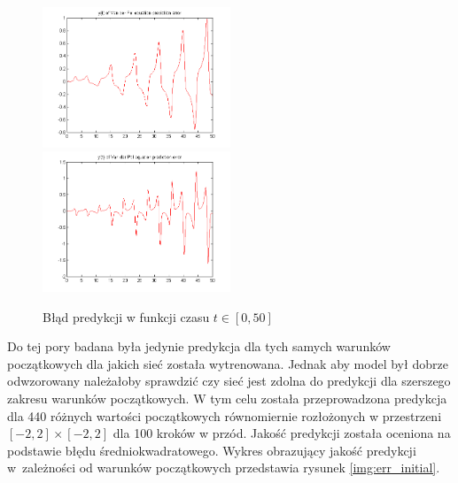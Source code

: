 \begin{figure}[ht!]
	\centering

	\subfloat
	{\includegraphics[width=0.5\textwidth]
	{images/err1000_x1.png}}
	\subfloat
	{\includegraphics[width=0.5\textwidth]
	{images/err1000_x2.png}}	
	

	\caption{Błąd predykcji w funkcji czasu $t \in [0,50]$}
	\label{img:err}
\end{figure}

Do tej pory badana była jedynie predykcja dla tych samych warunków początkowych dla jakich sieć została wytrenowana. Jednak aby model był dobrze odwzorowany należałoby sprawdzić czy sieć jest zdolna do predykcji dla szerszego zakresu warunków początkowych. W tym celu została przeprowadzona predykcja dla 440 różnych wartości początkowych równomiernie rozłożonych w przestrzeni $[-2,2] \times [-2,2]$ dla 100 kroków w przód. Jakość predykcji została oceniona na podstawie błędu średniokwadratowego. Wykres obrazujący jakość predykcji w~zależności od warunków początkowych przedstawia rysunek \ref{img:err_initial}.

